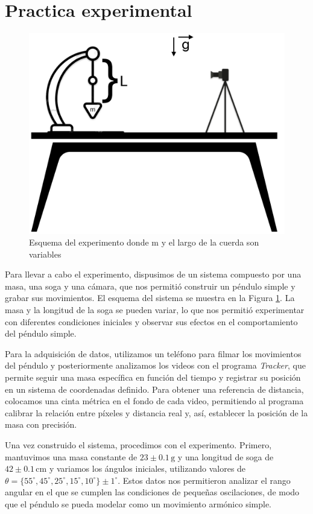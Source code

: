 \documentclass[12pt,a4]{article}
\begin{document}
\section{Practica experimental}

\begin{figure}[H]
    \centering
    \includegraphics[width=0.6\linewidth]{esquema.png}
    \caption{Esquema del experimento donde m y el largo de la cuerda son variables}   
    \label{fig:esquema}
\end{figure}

Para llevar a cabo el experimento, dispusimos de un sistema compuesto por una masa, una soga y una cámara, que nos permitió construir un péndulo simple y grabar sus movimientos. El esquema del sistema se muestra en la Figura \ref{fig:esquema}. La masa y la longitud de la soga se pueden variar, lo que nos permitió experimentar con diferentes condiciones iniciales y observar sus efectos en el comportamiento del péndulo simple.

Para la adquisición de datos, utilizamos un teléfono para filmar los movimientos del péndulo y posteriormente analizamos los videos con el programa \textit{Tracker}, que permite seguir una masa específica en función del tiempo y registrar su posición en un sistema de coordenadas definido. Para obtener una referencia de distancia, colocamos una cinta métrica en el fondo de cada video, permitiendo al programa calibrar la relación entre píxeles y distancia real y, así, establecer la posición de la masa con precisión.

Una vez construido el sistema, procedimos con el experimento. Primero, mantuvimos una masa constante de $23 \pm 0.1 \, \text{g}$ y una longitud de soga de $42 \pm 0.1 \, \text{cm}$ y variamos los ángulos iniciales, utilizando valores de $\theta = \{55^\circ, 45^\circ, 25^\circ, 15^\circ, 10^\circ\} \pm 1^\circ$. Estos datos nos permitieron analizar el rango angular en el que se cumplen las condiciones de pequeñas oscilaciones, de modo que el péndulo se pueda modelar como un movimiento armónico simple.
\end{document}
